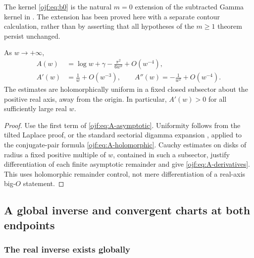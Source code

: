 The kernel \eqref{ojf:eq:b0} is the natural $m=0$ extension of the
subtracted Gamma kernel in \cite[label
\texttt{thm:Gamma-kernel}]{qfb:reports}. The extension has been proved
here with a separate contour calculation, rather than by asserting
that all hypotheses of the $m\ge1$ theorem persist unchanged.

\begin{corollary}
\label{ojf:cor:core-derivatives}
As $w\to+\infty$,
\begin{align}
 A(w)&=\log w+\gamma-\frac{\pi^2}{6w^2}+O(w^{-4}),\label{ojf:eq:A-two}\\
 A'(w)&=\frac1w+O(w^{-3}),\qquad
 A''(w)=-\frac1{w^2}+O(w^{-4}).\label{ojf:eq:A-derivatives}
\end{align}
The estimates are holomorphically uniform in a fixed closed subsector
about the positive real axis, away from the origin. In particular,
$A'(w)>0$ for all sufficiently large real $w$.
\end{corollary}
\begin{proof}
Use the first term of \eqref{ojf:eq:A-asymptotic}. Uniformity follows
from the tilted Laplace proof, or the standard sectorial digamma
expansion \cite[Eq.~5.11.2]{ojf:DLMFDigamma}, applied to the conjugate-pair
formula \eqref{ojf:eq:A-holomorphic}. Cauchy estimates on disks of radius
a fixed positive multiple of $w$, contained in such a subsector, justify
differentiation of each finite asymptotic remainder and give
\eqref{ojf:eq:A-derivatives}. This uses holomorphic remainder control,
not mere differentiation of a real-axis big-$O$ statement.
\end{proof}

\subsection{A global inverse and convergent charts at both endpoints}
\label{ojf:sec:inverse}

\subsubsection{The real inverse exists globally}

